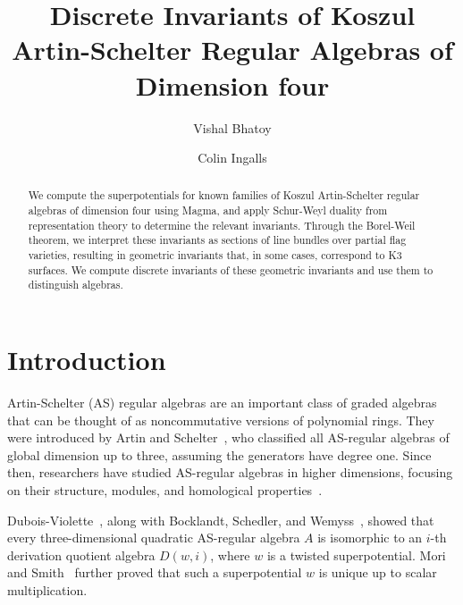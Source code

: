 \documentclass{amsart}
\title[Koszul Artin Schelter-Regular Algebras of Dimension four]{Discrete Invariants of Koszul Artin-Schelter Regular Algebras of Dimension four}
\author{Vishal Bhatoy}
\author{Colin Ingalls}
\begin{document}
\begin{abstract}
We compute the superpotentials for known families of Koszul Artin-Schelter regular algebras of dimension four using Magma, and apply Schur-Weyl duality from representation theory to determine the relevant invariants. Through the Borel-Weil theorem, we interpret these invariants as sections of line bundles over partial flag varieties, resulting in geometric invariants that, in some cases, correspond to K3 surfaces. We compute discrete invariants of these geometric invariants and use them to distinguish algebras.
\end{abstract}
\maketitle
\newtheorem{theorem}{Theorem}[section]  %
\newtheorem{lemma}[theorem]{Lemma}       %
\newtheorem{proposition}[theorem]{Proposition}  %
\newtheorem{corollary}[theorem]{Corollary}      %
\theoremstyle{definition}
\newtheorem{definition}[theorem]{Definition}    %
\newtheorem{remark}[theorem]{Remark}            %
\newtheorem{example}[theorem]{Example}           %
\newtheorem{question}[theorem]{Question}         %
\newtheorem{custom_def}[theorem]{} 
\newtheorem*{mainthm}{Theorem}






\section{Introduction}

Artin-Schelter (AS) regular algebras are an important class of graded algebras that can be thought of as noncommutative versions of polynomial rings. They were introduced by Artin and Schelter~\cite{Artin2007SomeAA, MR1128218, ARTIN1987171}, who classified all AS-regular algebras of global dimension up to three, assuming the generators have degree one. Since then, researchers have studied AS-regular algebras in higher dimensions, focusing on their structure, modules, and homological properties~\cite{bellamy2016noncommutative, rogalski2023artinschelter, Shelton2001OnKA, 1996_Tate, 1993}.

Dubois-Violette~\cite{duboisviolette2014multilinearformsgradedalgebras}, along with Bocklandt, Schedler, and Wemyss~\cite{BOCKLANDT20101501}, showed that every three-dimensional quadratic AS-regular algebra \(A\) is isomorphic to an \(i\)-th derivation quotient algebra \(D(w,i)\), where \(w\) is a twisted superpotential. Mori and Smith~\cite{Mori_Izuru_Smith} further proved that such a superpotential \(w\) is unique up to scalar multiplication.
\end{document}
